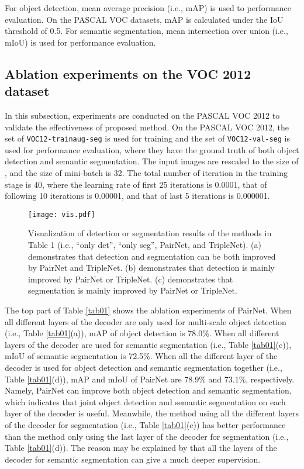 \documentclass[10pt,twocolumn,letterpaper]{article}
\begin{document}
For object detection, mean average precision (i.e., mAP) is used to performance evaluation. On the PASCAL VOC datasets, mAP is calculated under the IoU threshold of 0.5. For semantic segmentation, mean intersection over union (i.e., mIoU) is used for performance evaluation.

\subsection{Ablation experiments on the VOC 2012 dataset}
In this subsection, experiments are conducted on the PASCAL VOC 2012 to validate the effectiveness of proposed method.
On the PASCAL VOC 2012, the set of \texttt{VOC12-trainaug-seg} is used for training and the set of \texttt{VOC12-val-seg} is used for performance evaluation, where they have the ground truth of both object detection and semantic segmentation. The input images are rescaled to the size of , and the size of mini-batch is 32. The total number of iteration in the training stage is 40, where the learning rate of first 25 iterations is 0.0001, that of following 10 iterations is 0.00001, and that of last 5 iterations is 0.000001.  
\begin{figure*}[t]
\begin{center}
\texttt{[image: vis.pdf]}
\end{center}
   \caption{Visualization of detection or segmentation results of the methods in Table 1 (i.e., ``only det'', ``only seg'', PairNet, and TripleNet). (a) demonstrates that detection and segmentation can be both improved by PairNet and TripleNet. (b) demonstrates that detection is mainly improved by PairNet or TripleNet. (c) demonstrates that segmentation is mainly improved by PairNet or TripleNet.}
\label{fig04}
\end{figure*}

The top part of Table \ref{tab01} shows the ablation experiments of PairNet. When all different layers of the decoder are only used for multi-scale object detection (i.e., Table \ref{tab01}(a)), mAP of object detection is 78.0\%. When all different layers of the decoder are used for semantic segmentation (i.e., Table \ref{tab01}(c)), mIoU of semantic segmentation is 72.5\%. When all the different layer of the decoder is used for object detection and semantic segmentation together (i.e., Table \ref{tab01}(d)), mAP and mIoU of PairNet are 78.9\% and 73.1\%, respectively. Namely, PairNet can improve both object detection and semantic segmentation, which indicates that joint object detection and semantic segmentation on each layer of the decoder is useful. Meanwhile, the method using all the different layers of the decoder for segmentation (i.e., Table \ref{tab01}(c)) has better performance than the method only using the last layer of the decoder for segmentation (i.e., Table \ref{tab01}(d)). The reason may be explained by that all the layers of the decoder for semantic segmentation can give a much deeper supervision.
\end{document}
